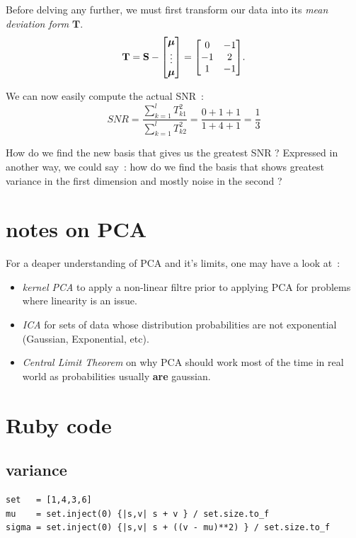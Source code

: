 \documentclass[11pt,twocolumn]{amsart} %
\newcommand{\ve}[1]{\boldsymbol{#1}}
\newenvironment{m}{\begin{bmatrix}}{\end{bmatrix}}
\begin{document}
Before delving any further, we must first transform our data into its \emph{mean deviation form} $\textbf{T}$. 
\[
  \textbf{T} = \textbf{S} - \begin{m}\ve{\mu} \\ \vdots \\ \ve{\mu}\end{m} = \begin{m} 0 & -1 \\ -1 & 2 \\ 1 & -1\end{m}.
\]

We can now easily compute the actual SNR~:
\[
  SNR = \frac{\sum_{k=1}^l T_{k1}^2}{\sum_{k=1}^l T_{k2}^2} = \frac{0+1+1}{1+4+1} = \frac{1}{3}
\]

How do we find the new basis that gives us the greatest SNR ? Expressed in another way, we could say~: how do we find the basis that shows greatest variance in the first dimension and mostly noise in the second ?

\section{notes on PCA}

For a deaper understanding of PCA and it's limits, one may have a look at~:
\begin{itemize}
  \item \emph{kernel PCA} to apply a non-linear filtre prior to applying PCA for problems where linearity is an issue.
  \item \emph{ICA} for sets of data whose distribution probabilities are not exponential (Gaussian, Exponential, etc).
  \item \emph{Central Limit Theorem} on why PCA should work most of the time in real world as probabilities usually \textbf{are} gaussian.
\end{itemize}

\onecolumn

\section{Ruby code}
\subsection{variance}
\begin{verbatim}
set   = [1,4,3,6]
mu    = set.inject(0) {|s,v| s + v } / set.size.to_f
sigma = set.inject(0) {|s,v| s + ((v - mu)**2) } / set.size.to_f
\end{verbatim}
\end{document}
